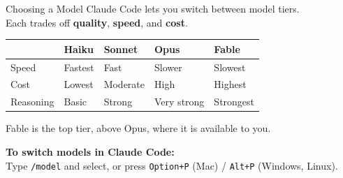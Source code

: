 \documentclass[aspectratio=169, 11pt]{beamer}
\begin{document}

\begin{frame}{Choosing a Model}
  Claude Code lets you switch between model tiers.\\
  Each trades off \textbf{quality}, \textbf{speed}, and \textbf{cost}.

  \vspace{0.5em}
  \begin{center}
  \small
  \begin{tabular}{@{}lllll@{}}
    \toprule
    & \textbf{Haiku} & \textbf{Sonnet} & \textbf{Opus} & \textbf{Fable} \\
    \midrule
    Speed     & Fastest & Fast     & Slower      & Slowest \\
    Cost      & Lowest  & Moderate & High        & Highest \\
    Reasoning & Basic   & Strong   & Very strong & Strongest \\
    \bottomrule
  \end{tabular}
  \end{center}

  \vspace{0.3em}
  {\small Fable is the top tier, above Opus, where it is available to you.}

  \vspace{0.3em}
  \textbf{To switch models in Claude Code:}\\
  Type \texttt{/model} and select, or press \texttt{Option+P} (Mac) / \texttt{Alt+P} (Windows, Linux).
\end{frame}
\end{document}
